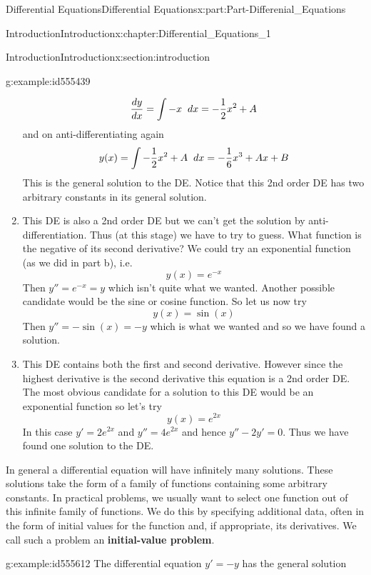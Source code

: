 \documentclass[oneside,10pt,]{book}
\newcommand{\terminology}[1]{\textbf{#1}}
\numberwithin{equation}{section}
\begin{document}
\begin{partptx}{Differential Equations}{}{Differential Equations}{}{}{x:part:Part-Differenial_Equations}
\begin{chapterptx}{Introduction}{}{Introduction}{}{}{x:chapter:Differential_Equations_1}
\begin{sectionptx}{Introduction}{}{Introduction}{}{}{x:section:introduction}
\begin{example}{}{g:example:id555439}
\begin{enumerate}[label=\alph*.]
\begin{equation*}
\frac{dy}{dx}=\int -x \hspace{2mm} dx=-\frac{1}{2}x^2+A
\end{equation*}
and on anti-differentiating again%
\begin{equation*}
y(x)=\int -\frac{1}{2}x^2+A \hspace{2mm} dx=-\frac{1}{6}x^3+Ax+B
\end{equation*}
This is the general solution to the DE. Notice that this 2nd order DE has two arbitrary constants in its general solution.%
\item{}This DE is also a 2nd order DE but we can’t get the solution by anti-differentiation. Thus (at this stage) we have to try to guess. What function is the negative of its second derivative? We could try an exponential function (as we did in part b), i.e.%
\begin{equation*}
y(x)=e^{-x}
\end{equation*}
Then \(y''=e^{-x}=y\) which isn’t quite what we wanted. Another possible candidate would be the sine or cosine function. So let us now try%
\begin{equation*}
y(x)=\sin(x)
\end{equation*}
Then \(y''=-\sin(x)=-y\) which is what we wanted and so we have found a solution.%
\item{}This DE contains both the first and second derivative. However since the highest derivative is the second derivative this equation is a 2nd order DE. The most obvious candidate for a solution to this DE would be an exponential function so let’s try%
\begin{equation*}
y(x)=e^{2x}
\end{equation*}
In this case \(y'=2e^{2x}\) and \(y''=4e^{2x}\) and hence \(y''-2y'=0\). Thus we have found one solution to the DE.%
\end{enumerate}
%
\end{example}
In general a differential equation will have infinitely many solutions. These solutions take the form of a family of functions containing some arbitrary constants. In practical problems, we usually want to select one function out of this infinite family of functions. We do this by specifying additional data, often in the form of initial values for the function and, if appropriate, its derivatives. We call such a problem an \terminology{initial-value problem}.%
\begin{example}{}{g:example:id555612}%
The differential equation \(y'=-y\) has the general solution%
\begin{equation*}

\end{equation*}
\end{example}
\end{sectionptx}
\end{chapterptx}
\end{partptx}
\end{document}
